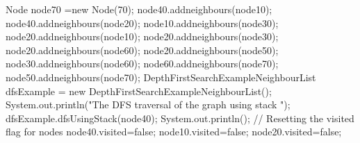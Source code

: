 \documentclass{report}
\begin{document}
		\hspace*{1cm}Node node70 =new Node(70);\newline
 		\hspace*{1cm}node40.addneighbours(node10);\newline
		\hspace*{1cm}node40.addneighbours(node20);\newline
		\hspace*{1cm}node10.addneighbours(node30);\newline
        \hspace*{1cm}node20.addneighbours(node10);\newline
		\hspace*{1cm}node20.addneighbours(node30);\newline
		\hspace*{1cm}node20.addneighbours(node60);\newline
		\hspace*{1cm}node20.addneighbours(node50);\newline
		\hspace*{1cm}node30.addneighbours(node60);\newline
		\hspace*{1cm}node60.addneighbours(node70);\newline
		\hspace*{1cm}node50.addneighbours(node70);\newline
 		\hspace*{1cm}DepthFirstSearchExampleNeighbourList dfsExample = new DepthFirstSearchExampleNeighbourList();\newline
 		\hspace*{1cm}System.out.println("The DFS traversal of the graph using stack ");\newline
		\hspace*{1cm}dfsExample.dfsUsingStack(node40);\newline
 		\hspace*{1cm}System.out.println();\newline
 		\hspace*{1cm}// Resetting the visited flag for nodes\newline
		\hspace*{1cm}node40.visited=false;\newline
		\hspace*{1cm}node10.visited=false;\newline
		\hspace*{1cm}node20.visited=false;\newline
\end{document}
